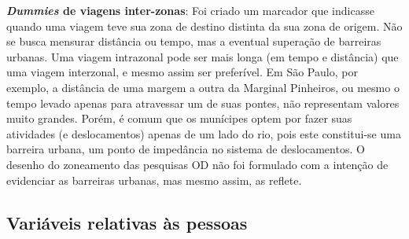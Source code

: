 \begin{compactitem}
\item \textbf{\textit{Dummies} de viagens inter-zonas}: Foi criado um marcador que indicasse quando uma viagem teve sua zona de destino distinta da sua zona de origem. Não se busca mensurar distância ou tempo, mas a eventual superação de barreiras urbanas. Uma viagem intrazonal pode ser mais longa (em tempo e distância) que uma viagem interzonal, e mesmo assim ser preferível. Em São Paulo, por exemplo, a distância de uma margem a outra da Marginal Pinheiros, ou mesmo o tempo levado apenas para atravessar um de suas pontes, não representam valores muito grandes. Porém, é comum que os munícipes optem por fazer suas atividades (e deslocamentos) apenas de um lado do rio, pois este constitui-se uma barreira urbana, um ponto de impedância no sistema de deslocamentos. O desenho do zoneamento das pesquisas OD não foi formulado com a intenção de evidenciar as barreiras urbanas, mas mesmo assim, as reflete.

\end{compactitem}

\subsection{Variáveis relativas às pessoas}\label{subsec:novas-var-pess}

